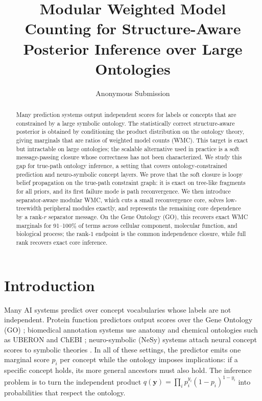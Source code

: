\documentclass[letterpaper]{article}
\title{Modular Weighted Model Counting for Structure-Aware Posterior Inference over Large Ontologies}
\author{
    Anonymous Submission
}
\newcommand{\bC}[1]{\boldsymbol{#1}}
\begin{document}
\maketitle

\begin{abstract}
Many prediction systems output independent scores for labels or concepts that are constrained by a large symbolic ontology. The statistically correct structure-aware posterior is obtained by conditioning the product distribution on the ontology theory, giving marginals that are ratios of weighted model counts (WMC). This target is exact but intractable on large ontologies; the scalable alternative used in practice is a soft message-passing closure whose correctness has not been characterized. We study this gap for true-path ontology inference, a setting that covers ontology-constrained prediction and neuro-symbolic concept layers. We prove that the soft closure is loopy belief propagation on the true-path constraint graph: it is exact on tree-like fragments for all priors, and its first failure mode is path reconvergence. We then introduce separator-aware modular WMC, which cuts a small reconvergence core, solves low-treewidth peripheral modules exactly, and represents the remaining core dependence by a rank-$r$ separator message. On the Gene Ontology (GO), this recovers exact WMC marginals for 91--100\% of terms across cellular component, molecular function, and biological process; the rank-$1$ endpoint is the common independence closure, while full rank recovers exact core inference.
\end{abstract}

\section{Introduction}
Many AI systems predict over concept vocabularies whose labels are not independent. Protein function predictors output scores over the Gene Ontology (GO) \citep{ashburner2000go,geneontology2023,kulmanov2020deepgoplus,kulmanov2022deepgozero,yu2023clean}; biomedical annotation systems use anatomy and chemical ontologies such as UBERON and ChEBI \citep{mungall2012uberon,hastings2016chebi}; neuro-symbolic (NeSy) systems attach neural concept scores to symbolic theories \citep{manhaeve2018deepproblog,xu2018semanticloss,ahmed2022spl}. In all of these settings, the predictor emits one marginal score $p_i$ per concept while the ontology imposes implications: if a specific concept holds, its more general ancestors must also hold. The inference problem is to turn the independent product $q(\bC y)=\prod_i p_i^{y_i}(1-p_i)^{1-y_i}$ into probabilities that respect the ontology.
\end{document}
